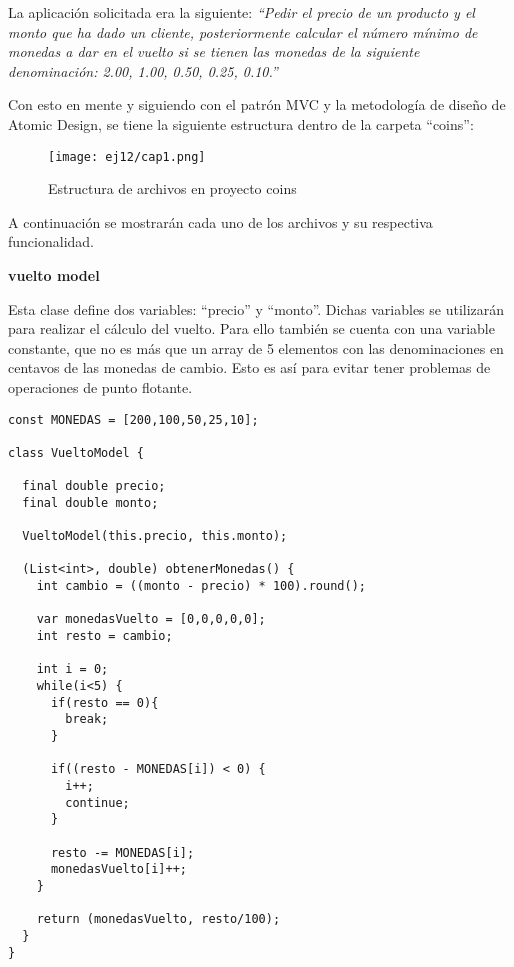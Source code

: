
La aplicación solicitada era la siguiente: \textit {“Pedir el precio de un producto y el monto que ha dado un cliente, posteriormente calcular el número mínimo de monedas a dar en el vuelto si se tienen las monedas de la siguiente denominación: 2.00, 1.00, 0.50, 0.25, 0.10.”}

Con esto en mente y siguiendo con el patrón MVC y la metodología de diseño de Atomic Design, se tiene la siguiente estructura dentro de la carpeta “coins”:

\begin{figure}[H]
    \centering
    \texttt{[image: ej12/cap1.png]}
    \caption{Estructura de archivos en proyecto coins}
    \label{fig:ej12il1}
\end{figure}

A continuación se mostrarán cada uno de los archivos y su respectiva funcionalidad.

\textbf{vuelto model}

Esta clase define dos variables: “precio” y “monto”. Dichas variables se utilizarán para realizar el cálculo del vuelto. Para ello también se cuenta con una variable constante, que no es más que un array de 5 elementos con las denominaciones en centavos de las monedas de cambio. Esto es así para evitar tener problemas de operaciones de punto flotante.

\begin{center}
\begin{lstlisting}
const MONEDAS = [200,100,50,25,10];

class VueltoModel {

  final double precio;
  final double monto;

  VueltoModel(this.precio, this.monto);

  (List<int>, double) obtenerMonedas() {
    int cambio = ((monto - precio) * 100).round();

    var monedasVuelto = [0,0,0,0,0];
    int resto = cambio;

    int i = 0;
    while(i<5) {
      if(resto == 0){
        break;
      }

      if((resto - MONEDAS[i]) < 0) {
        i++;
        continue;
      }

      resto -= MONEDAS[i];
      monedasVuelto[i]++;
    }

    return (monedasVuelto, resto/100);
  }
}
\end{lstlisting}
\end{center}

